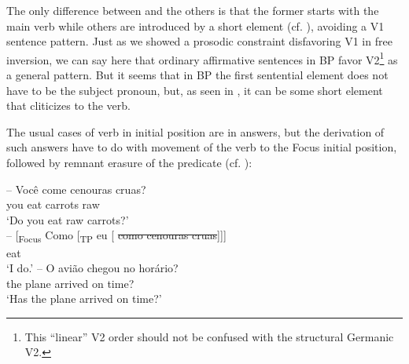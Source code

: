 \documentclass[output=paper,colorlinks,citecolor=brown]{langscibook}
\begin{document}
\ea\label{ex:03:kato:20} %
    \label{ex:03:kato:20a}
    \label{ex:03:kato:20b}
    \label{ex:03:kato:20c}
    \label{ex:03:kato:20d}

   \z

\z

The only difference between  and the others is that the former starts with the main verb while others are introduced by a short element (cf. \citealt{duarte1995}), avoiding a V1 sentence pattern.  Just as we showed a prosodic constraint disfavoring V1 in free inversion, we can say here that ordinary affirmative sentences in BP favor V2\footnote{This ``linear'' V2 order should not be confused with the structural Germanic V2.} as a general pattern. But it seems that in BP the first sentential element does not have to be the subject pronoun, but, as seen in , it can be some short element that cliticizes to the verb.

The usual cases of verb in initial position are in answers, but the derivation of such answers have to do with movement of the verb to the Focus initial position, followed by remnant erasure of the predicate (cf. \citealt{kato2013b}):

\ea\label{ex:03:kato:21}
 \gll -- Você come cenouras cruas?  \\
     {} you eat       carrots    raw       \\
     \glt \hphantom{-- }‘Do you eat raw carrots?’\\

 \gll -- [\textsubscript{Focus} Como [\textsubscript{TP} eu [ \sout{como cenouras cruas}]]] \\
          {} {}  eat\\
      \glt \hphantom{-- }‘I do.’
\z
\ea\label{ex:03:kato:22}\gll -- O avião chegou no horário?\\
           {} the plane arrived on time?            \\
           \glt \hphantom{-- }‘Has the plane arrived on time?’\\
\end{document}
